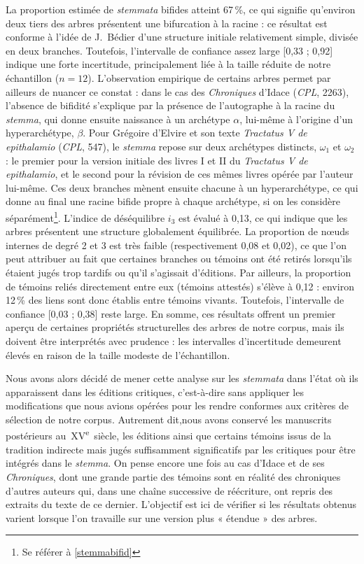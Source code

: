 \documentclass[a4paper,twoside,12pt]{book}
\begin{document}
La proportion estimée de \textit{stemmata} bifides atteint 67\,\%, ce qui signifie qu’environ deux tiers des arbres présentent une bifurcation à la racine : ce  résultat est conforme à l’idée de J.~Bédier d’une structure initiale relativement simple, divisée en deux branches. Toutefois, l’intervalle de confiance assez large [0{,}33 ; 0{,}92] indique une forte incertitude, principalement liée à la taille réduite de notre échantillon (\( n = 12 \)). L’observation empirique de certains arbres permet par ailleurs de nuancer ce constat : dans le cas des \textit{Chroniques} d’Idace (\textit{CPL}, 2263), l’absence de bifidité s’explique par la présence de l’autographe à la racine du \textit{stemma}, qui donne ensuite naissance à un archétype $\alpha$, lui-même à l’origine d'un hyperarchétype, $\beta$. Pour Grégoire d’Elvire et son texte \textit{Tractatus V de epithalamio} (\textit{CPL}, 547), le \textit{stemma} repose sur deux archétypes distincts, $\omega_1$ et $\omega_2$ : le premier pour la version initiale des livres I et II du \textit{Tractatus V de epithalamio}, et le second pour la révision de ces mêmes livres opérée par l’auteur lui-même. Ces deux branches mènent ensuite chacune à un hyperarchétype, ce qui donne au final une racine bifide propre à chaque archétype, si on les considère séparément\footnote{Se référer à \ref{stemmabifid}}.
L’indice de déséquilibre $i_3$ est évalué à 0{,}13, ce qui indique que les arbres présentent une structure globalement équilibrée. La proportion de nœuds internes de degré 2 et 3 est très faible (respectivement 0{,}08 et 0{,}02), ce que l’on peut attribuer au fait que certaines branches ou témoins ont été retirés lorsqu’ils étaient jugés trop tardifs ou qu’il s’agissait d’éditions. Par ailleurs, la proportion de témoins reliés directement entre eux (témoins attestés) s’élève à 0{,}12 : environ 12\,\% des liens sont donc établis entre témoins vivants. Toutefois, l’intervalle de confiance [0{,}03 ; 0{,}38] reste large.
En somme, ces résultats offrent un premier aperçu de certaines propriétés structurelles des arbres de notre corpus, mais ils doivent être interprétés avec prudence : les intervalles d’incertitude demeurent élevés en raison de la taille modeste de l’échantillon.

Nous avons alors décidé de mener cette analyse sur les \textit{stemmata} dans l’état où ils apparaissent dans les éditions critiques, c’est-à-dire sans appliquer les modifications que nous avions opérées pour les rendre conformes aux critères de sélection de notre corpus. Autrement dit,nous avons conservé les manuscrits postérieurs au~XV\textsuperscript{e}~siècle, les éditions ainsi que certains témoins issus de la tradition indirecte mais jugés suffisamment significatifs par les critiques pour être intégrés dans le \textit{stemma}. On pense encore une fois au cas d’Idace et de ses \textit{Chroniques}, dont une grande partie des témoins sont en réalité des chroniques d’autres auteurs qui, dans une chaîne successive de réécriture, ont repris des extraits du texte de ce dernier. L’objectif est ici de vérifier si les résultats obtenus varient lorsque l’on travaille sur une version plus « étendue » des arbres.
\end{document}

